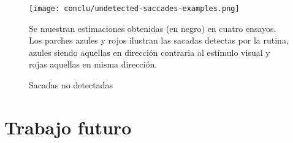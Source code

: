 \begin{itemize}
  \begin{figure}
    \centering

    \texttt{[image: conclu/undetected-saccades-examples.png]}

    Se muestran estimaciones obtenidas (en negro) en cuatro ensayos.
    Los parches azules y rojos ilustran las sacadas detectas por la rutina,
    azules siendo aquellas en dirección contraria al estímulo visual y rojas
    aquellas en misma dirección.

    \caption{Sacadas no detectadas}
    \label{fig:undetected-saccades-examples}
  \end{figure}

\end{itemize}

\section{Trabajo futuro}

